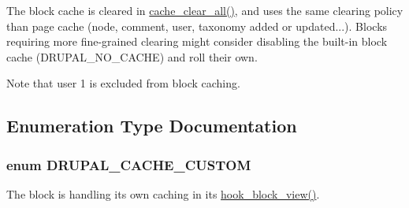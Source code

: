 The block cache is cleared in \hyperlink{includes_2cache_8inc_a409b34dd629640d791a11736a9de8125}{cache\_\-clear\_\-all()}, and uses the same clearing policy than page cache (node, comment, user, taxonomy added or updated...). Blocks requiring more fine-\/grained clearing might consider disabling the built-\/in block cache (DRUPAL\_\-NO\_\-CACHE) and roll their own.

Note that user 1 is excluded from block caching. 

\subsection{Enumeration Type Documentation}
\hypertarget{group__block__caching_gaca17d982799dd205caa54b00e700db42}{
\subsubsection[{DRUPAL\_\-CACHE\_\-CUSTOM}]{\setlength{\rightskip}{0pt plus 5cm}enum {\bf DRUPAL\_\-CACHE\_\-CUSTOM}}}
\label{group__block__caching_gaca17d982799dd205caa54b00e700db42}
The block is handling its own caching in its \hyperlink{group__hooks_gaa14092a3e74cdc57aa295100cfd6860d}{hook\_\-block\_\-view()}.

